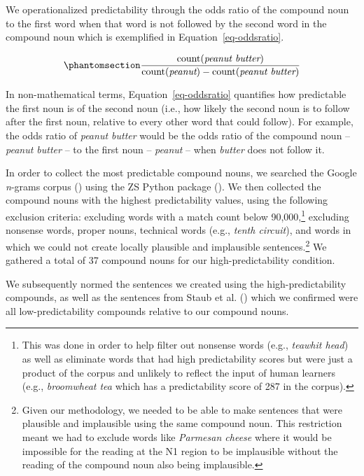 \documentclass[
  12pt,
  letterpaper,
]{scrreport}
\begin{document}
We operationalized predictability through the odds ratio of the compound
noun to the first word when that word is not followed by the second word
in the compound noun which is exemplified in
Equation~\ref{eq-oddsratio}.

\begin{equation}\phantomsection\label{eq-oddsratio}{
\frac{\mathrm{count(\textit{peanut butter})}}{\mathrm{count(\textit{peanut})} - \mathrm{count(\textit{peanut butter})}} 
}\end{equation}

In non-mathematical terms, Equation~\ref{eq-oddsratio} quantifies how
predictable the first noun is of the second noun (i.e., how likely the
second noun is to follow after the first noun, relative to every other
word that could follow). For example, the odds ratio of \emph{peanut
butter} would be the odds ratio of the compound noun -- \emph{peanut
butter} -- to the first noun -- \emph{peanut} -- when \emph{butter} does
not follow it.

In order to collect the most predictable compound nouns, we searched the
Google \emph{n}-grams corpus
() using the ZS Python package
(). We then collected
the compound nouns with the highest predictability values, using the
following exclusion criteria: excluding words with a match count below
90,000,\footnote{This was done in order to help filter out nonsense
  words (e.g., \emph{teawhit head}) as well as eliminate words that had
  high predictability scores but were just a product of the corpus and
  unlikely to reflect the input of human learners (e.g.,
  \emph{broomwheat tea} which has a predictability score of 287 in the
  corpus).} excluding nonsense words, proper nouns, technical words
(e.g., \emph{tenth circuit}), and words in which we could not create
locally plausible and implausible sentences.\footnote{Given our
  methodology, we needed to be able to make sentences that were
  plausible and implausible using the same compound noun. This
  restriction meant we had to exclude words like \emph{Parmesan cheese}
  where it would be impossible for the reading at the N1 region to be
  implausible without the reading of the compound noun also being
  implausible.} We gathered a total of 37 compound nouns for our
high-predictability condition.

We subsequently normed the sentences we created using the
high-predictability compounds, as well as the sentences from Staub et
al. () which we
confirmed were all low-predictability compounds relative to our compound
nouns.
\end{document}
